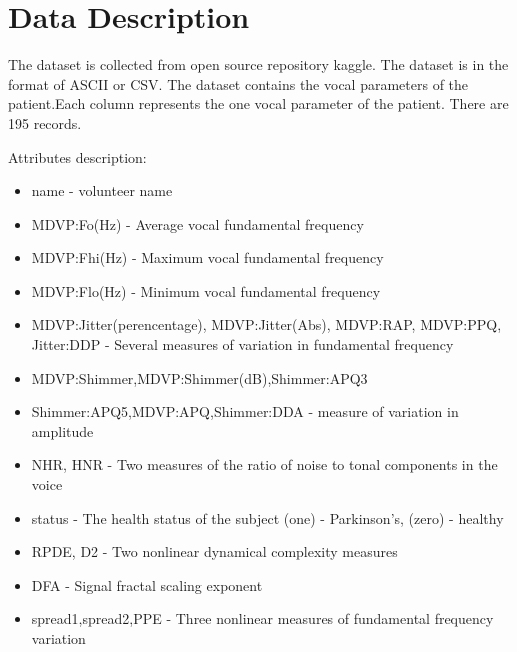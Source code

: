 \documentclass[conference]{IEEEtran}
\begin{document}
\section{Data Description}\label{AA}
The dataset is collected from open source repository kaggle. The dataset is in the format of ASCII or CSV. The dataset contains the vocal parameters of the patient.Each column represents the one vocal parameter of the patient. There are 195 records.

Attributes description:
\begin{itemize}
    \item name - volunteer name 
    \item MDVP:Fo(Hz) - Average vocal fundamental frequency
    \item MDVP:Fhi(Hz) - Maximum vocal fundamental frequency
    \item MDVP:Flo(Hz) - Minimum vocal fundamental frequency
    \item MDVP:Jitter(perencentage), MDVP:Jitter(Abs), MDVP:RAP, MDVP:PPQ, Jitter:DDP - Several measures of variation in fundamental frequency
    \item MDVP:Shimmer,MDVP:Shimmer(dB),Shimmer:APQ3
    \item Shimmer:APQ5,MDVP:APQ,Shimmer:DDA - measure of variation in amplitude
    \item NHR, HNR - Two measures of the ratio of noise to tonal components in the voice
    \item status - The health status of the subject (one) - Parkinson's, (zero) - healthy
    \item RPDE, D2 - Two nonlinear dynamical complexity measures
    \item DFA - Signal fractal scaling exponent
    \item spread1,spread2,PPE - Three nonlinear measures of fundamental frequency variation
\end{itemize}

\newpage
\end{document}
